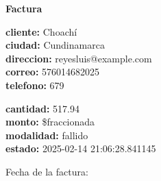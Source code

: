 \documentclass{article}
\begin{document}
\begin{center}
    {\LARGE \textbf{Factura}}\\[1cm]
\end{center}

\textbf{cliente:} Choachí \\
\textbf{ciudad:} Cundinamarca \\
\textbf{direccion:} reyesluis@example.com \\
\textbf{correo:} 576014682025 \\
\textbf{telefono:} 679 \\

\vspace{0.5cm}

\textbf{cantidad:} 517.94 \\
\textbf{monto:} \$fraccionada \\
\textbf{modalidad:} fallido \\
\textbf{estado:} 2025-02-14 21:06:28.841145 \\

\vspace{1cm}

Fecha de la factura: 
\end{document}
